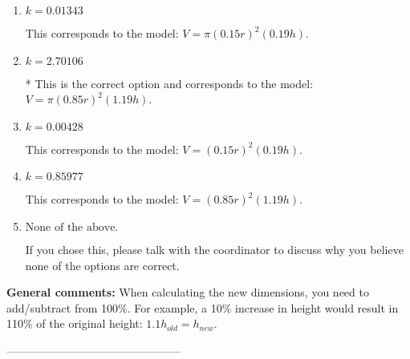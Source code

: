\documentclass{extbook}[14pt]
\begin{document}
\begin{enumerate}[label=\Alph*.] 
\item $ k = 0.01343 $ 

 This corresponds to the model: $V = \pi (0.15 r)^2 (0.19 h)$. 
\item $ k = 2.70106 $ 

 * This is the correct option and corresponds to the model: $V = \pi (0.85 r)^2 (1.19 h)$. 
\item $ k = 0.00428 $ 

 This corresponds to the model: $V = (0.15 r)^2 (0.19 h)$. 
\item $ k = 0.85977 $ 

 This corresponds to the model: $V = (0.85 r)^2 (1.19 h)$. 
\item $ \text{None of the above.} $ 

 If you chose this, please talk with the coordinator to discuss why you believe none of the options are correct. 
\end{enumerate} 
 
\textbf{General comments:} When calculating the new dimensions, you need to add/subtract from 100\%. For example, a 10\% increase in height would result in 110\% of the original height: $1.1h_{old} = h_{new}$.

-----------------------------------------------
\end{document}
